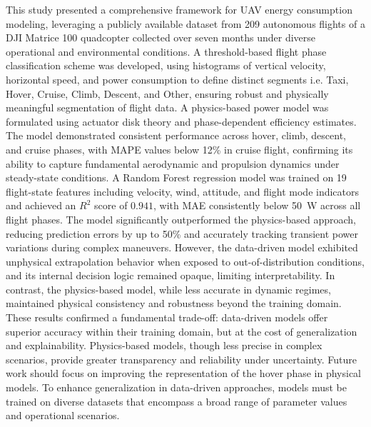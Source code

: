 This study presented a comprehensive framework for UAV energy consumption modeling, leveraging a publicly available dataset from 209 autonomous flights of a DJI Matrice 100 quadcopter collected over seven months under diverse operational and environmental conditions. A threshold-based flight phase classification scheme was developed, using histograms of vertical velocity, horizontal speed, and power consumption to define distinct segments i.e. Taxi, Hover, Cruise, Climb, Descent, and Other, ensuring robust and physically meaningful segmentation of flight data.
A physics-based power model was formulated using actuator disk theory and phase-dependent efficiency estimates. The model demonstrated consistent performance across hover, climb, descent, and cruise phases, with MAPE values below 12\% in cruise flight, confirming its ability to capture fundamental aerodynamic and propulsion dynamics under steady-state conditions.
A Random Forest regression model was trained on 19 flight-state features including velocity, wind, attitude, and flight mode indicators and achieved an
$R^2$ score of $0.941$, with MAE consistently below 50~W across all flight phases. The model significantly outperformed the physics-based approach, reducing prediction errors by up to 50\% and accurately tracking transient power variations during complex maneuvers.
However, the data-driven model exhibited unphysical extrapolation behavior when exposed to out-of-distribution conditions, and its internal decision logic remained opaque, limiting interpretability. In contrast, the physics-based model, while less accurate in dynamic regimes, maintained physical consistency and robustness beyond the training domain.
These results confirmed a fundamental trade-off: data-driven models offer superior accuracy within their training domain, but at the cost of generalization and explainability. Physics-based models, though less precise in complex scenarios, provide greater transparency and reliability under uncertainty. Future work should focus on improving the representation of the hover phase in physical models. To enhance generalization in data-driven approaches, models must be trained on diverse datasets that encompass a broad range of parameter values and operational scenarios.